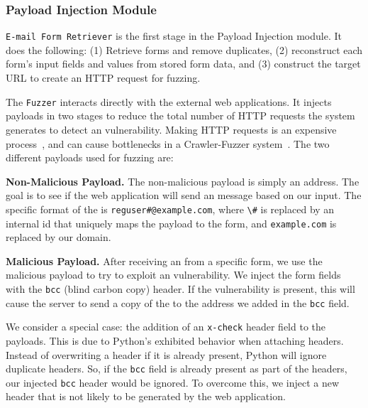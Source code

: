 \subsubsection{Payload Injection Module} \lstinline{E-mail Form Retriever} is the first stage in the Payload Injection
module. It does the following: (1) Retrieve forms and
remove duplicates, (2) reconstruct
each form's input fields and values from stored form data, and (3) construct the target URL
to create an HTTP request for fuzzing.

The \lstinline{Fuzzer} interacts directly with the external web applications. It
injects payloads in two stages to reduce the total number of HTTP requests the system generates to detect an \ehi vulnerability. Making HTTP requests is an expensive process~\cite{httpperf}, and can cause bottlenecks in a Crawler-Fuzzer system~\cite{ShkapenyukTorstenSuel2001}.
The two different payloads used for fuzzing are:

\noindent\textbf{Non-Malicious Payload.}
The non-malicious payload is simply an \email address. The goal is to see if the web application will send an \email message based on our input. The specific format of the \email is \lstinline|reguser#@example.com|, where \lstinline{\#} is replaced by an internal id that uniquely maps the payload to the form, and \lstinline{example.com} is replaced by our domain.

\noindent\textbf{Malicious Payload.}
After receiving an \email from a specific form, we use the malicious payload to try to exploit an \ehi vulnerability. We inject the form fields with the \lstinline{bcc} (blind carbon copy) header. If the vulnerability is present, this will cause the server to send a copy of the \email to the \email address we added in the \lstinline{bcc} field.

We consider a special case: the addition of an \lstinline{x-check} header field to the payloads. This is due to Python's exhibited behavior when attaching
headers. Instead of overwriting a header if it is already present, Python will ignore duplicate headers. So, if the \lstinline{bcc} field is already present as part of the headers, our injected \lstinline{bcc} header would be ignored. To overcome this, we inject a new header that is not likely to be generated by the web application. 

